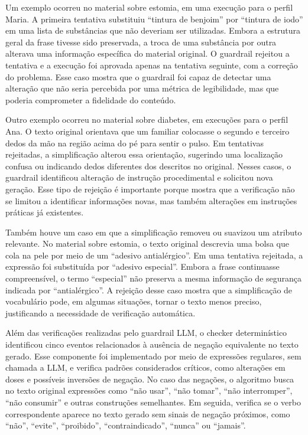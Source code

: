 Um exemplo ocorreu no material sobre estomia, em uma execução para o perfil Maria. A primeira tentativa substituiu ``tintura de benjoim'' por ``tintura de iodo'' em uma lista de substâncias que não deveriam ser utilizadas. Embora a estrutura geral da frase tivesse sido preservada, a troca de uma substância por outra alterava uma informação específica do material original. O guardrail rejeitou a tentativa e a execução foi aprovada apenas na tentativa seguinte, com a correção do problema. Esse caso mostra que o guardrail foi capaz de detectar uma alteração que não seria percebida por uma métrica de legibilidade, mas que poderia comprometer a fidelidade do conteúdo.

Outro exemplo ocorreu no material sobre diabetes, em execuções para o perfil Ana. O texto original orientava que um familiar colocasse o segundo e terceiro dedos da mão na região acima do pé para sentir o pulso. Em tentativas rejeitadas, a simplificação alterou essa orientação, sugerindo uma localização confusa ou indicando dedos diferentes dos descritos no original. Nesses casos, o guardrail identificou alteração de instrução procedimental e solicitou nova geração. Esse tipo de rejeição é importante porque mostra que a verificação não se limitou a identificar informações novas, mas também alterações em instruções práticas já existentes.

Também houve um caso em que a simplificação removeu ou suavizou um atributo relevante. No material sobre estomia, o texto original descrevia uma bolsa que cola na pele por meio de um ``adesivo antialérgico''. Em uma tentativa rejeitada, a expressão foi substituída por ``adesivo especial''. Embora a frase continuasse compreensível, o termo ``especial'' não preserva a mesma informação de segurança indicada por ``antialérgico''. A rejeição desse caso mostra que a simplificação de vocabulário pode, em algumas situações, tornar o texto menos preciso, justificando a necessidade de verificação automática.

Além das verificações realizadas pelo guardrail LLM, o checker determinístico identificou cinco eventos relacionados à ausência de negação equivalente no texto gerado. Esse componente foi implementado por meio de expressões regulares, sem chamada a LLM, e verifica padrões considerados críticos, como alterações em doses e possíveis inversões de negação. No caso das negações, o algoritmo busca no texto original expressões como ``não usar'', ``não tomar'', ``não interromper'', ``não consumir'' e outras construções semelhantes. Em seguida, verifica se o verbo correspondente aparece no texto gerado sem sinais de negação próximos, como ``não'', ``evite'', ``proibido'', ``contraindicado'', ``nunca'' ou ``jamais''.

